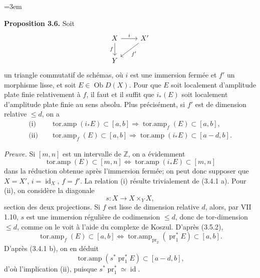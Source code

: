 \documentclass[11pt]{article}
\newcommand{\Spec}{\operatorname{Spec}}
\providecommand{\Coker}{\operatorname{Coker}}
\providecommand{\rank}{\operatorname{rank}}
\begin{document}
\providecommand{\Ob}{\operatorname{Ob}}
\providecommand{\D}{\mathrm D}
\providecommand{\Ho}{\mathrm H}
\providecommand{\RHom}{\mathrm R\!\operatorname{Hom}}
\providecommand{\parfamp}{\operatorname{parf.amp}}
\providecommand{\tamp}{\operatorname{tor.amp}}
\providecommand{\Qcoh}{\operatorname{Qcoh}}
\providecommand{\Mod}{\operatorname{Mod}}
\providecommand{\Coh}{\operatorname{Coh}}
\providecommand{\Lib}{\operatorname{Lib}}
\providecommand{\Loclib}{\operatorname{Loclib}}
\providecommand{\qcoh}{\mathrm{qcoh}}
\providecommand{\coh}{\mathrm{coh}}
\providecommand{\parf}{\mathrm{parf}}
\providecommand{\torf}{\mathrm{torf}}
\providecommand{\id}{\operatorname{id}}
\providecommand{\Coker}{\operatorname{Coker}}
\providecommand{\rank}{\operatorname{rank}}
\providecommand{\rg}{\operatorname{rg}}
\providecommand{\Hom}{\operatorname{Hom}}
\providecommand{\Ext}{\operatorname{Ext}}
\providecommand{\Spec}{\operatorname{Spec}}
\providecommand{\Cone}{\operatorname{Cone}}
\providecommand{\pt}{\operatorname{Pt}}
\providecommand{\ind}{\operatorname{ind}}
\hfuzz=20pt
\emergencystretch=3em

\textbf{Proposition 3.6.} Soit
\[
\begin{tikzcd}
X \arrow[r,"i"] \arrow[d,"f"'] & X' \arrow[dl,"f'"]\\
Y &
\end{tikzcd}
\]
un triangle commutatif de schémas, où \(i\) est une immersion fermée et \(f'\) un morphisme lisse, et soit \(E\in\Ob D(X)\). Pour que \(E\) soit localement d'amplitude plate finie relativement à \(f\), il faut et il suffit que \(i_*(E)\) soit localement d'amplitude plate finie au sens absolu. Plus précisément, si \(f'\) est de dimension relative \(\leq d\), on a
\begin{align*}
\text{(i)}\quad &\tamp(i_*E)\subset[a,b] \Longrightarrow \tamp_f(E)\subset[a,b],\\
\text{(ii)}\quad &\tamp_f(E)\subset[a,b] \Longrightarrow \tamp(i_*E)\subset[a-d,b].
\end{align*}

\emph{Preuve.} Si \([m,n]\) est un intervalle de \(\mathbb Z\), on a évidemment
\[
 \tamp(E)\subset[m,n]
 \Longleftrightarrow
 \tamp(i_*E)\subset[m,n]
\]
dans la réduction obtenue après l'immersion fermée; on peut donc supposer que \(X=X'\), \(i=\id_X\), \(f=f'\). La relation (i) résulte trivialement de (3.4.1 a). Pour (ii), on considère la diagonale
\[
 s:X\longrightarrow X\times_YX,
\]
section des deux projections. Si \(f\) est lisse de dimension relative \(d\), alors, par VII 1.10, \(s\) est une immersion régulière de codimension \(\leq d\), donc de tor-dimension \(\leq d\), comme on le voit à l'aide du complexe de Koszul. D'après (3.5.2),
\[
 \tamp_f(E)
 \subset[a,b]
 \Longleftrightarrow
 \tamp_{\operatorname{pr}_2}(\operatorname{pr}_1^*E)
 \subset[a,b].
\]
D'après (3.4.1 b), on en déduit
\[
 \tamp(s^*\operatorname{pr}_1^*E)
 \subset[a-d,b],
\]
d'où l'implication (ii), puisque \(s^*\operatorname{pr}_1^*\simeq\id\).
\end{document}
